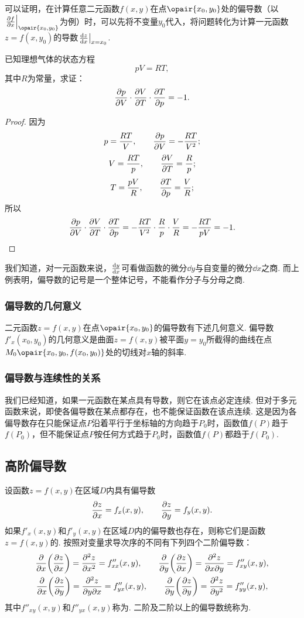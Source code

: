 可以证明，在计算任意二元函数\(f(x,y)\)在点\(\opair{x_0,y_0}\)处的偏导数（以\(\eval{\pdv{f}{x}}_{\opair{x_0,y_0}}\)为例）时，可以先将不变量\(y_0\)代入，将问题转化为计算一元函数\(z = f(x, y_0)\)的导数\(\eval{\dv{z}{x}}_{x=x_0}\).

\begin{example}
已知理想气体的状态方程\[
pV = RT,
\]其中\(R\)为常量，求证：\[
\pdv{p}{V} \cdot \pdv{V}{T} \cdot \pdv{T}{p} = -1.
\]
\begin{proof}
因为\[
p = \frac{RT}{V}, \qquad \pdv{p}{V} = -\frac{RT}{V^2};
\]\[
V = \frac{RT}{p}, \qquad \pdv{V}{T} = \frac{R}{p};
\]\[
T = \frac{pV}{R}, \qquad \pdv{T}{p} = \frac{V}{R};
\]所以\[
\pdv{p}{V} \cdot \pdv{V}{T} \cdot \pdv{T}{p}
= -\frac{RT}{V^2} \cdot \frac{R}{p} \cdot \frac{V}{R}
= -\frac{RT}{pV} = -1.
\qedhere
\]
\end{proof}
\end{example}

我们知道，对一元函数来说，\(\dv{y}{x}\)可看做函数的微分\(\dd{y}\)与自变量的微分\(\dd{x}\)之商.
而上例表明，偏导数的记号是一个整体记号，不能看作分子与分母之商.

\subsubsection{偏导数的几何意义}
二元函数\(z=f(x,y)\)在点\(\opair{x_0,y_0}\)的偏导数有下述几何意义.
偏导数\(f'_x(x_0,y_0)\)的几何意义是曲面\(z=f(x,y)\)被平面\(y=y_0\)所截得的曲线在点\(M_0\opair{x_0,y_0,f(x_0,y_0)}\)处的切线对\(x\)轴的斜率.

\subsubsection{偏导数与连续性的关系}
我们已经知道，如果一元函数在某点具有导数，则它在该点必定连续.
但对于多元函数来说，即使各偏导数在某点都存在，也不能保证函数在该点连续.
这是因为各偏导数存在只能保证点\(P\)沿着平行于坐标轴的方向趋于\(P_0\)时，函数值\(f(P)\)趋于\(f(P_0)\)，但不能保证点\(P\)按任何方式趋于\(P_0\)时，函数值\(f(P)\)都趋于\(f(P_0)\).

\subsection{高阶偏导数}
\begin{definition}
设函数\(z=f(x,y)\)在区域\(D\)内具有偏导数\[
\pdv{z}{x} = f_x(x,y), \qquad
\pdv{z}{y} = f_y(x,y).
\]如果\(f'_x(x,y)\)和\(f'_y(x,y)\)在区域\(D\)内的偏导数也存在，则称它们是函数\(z=f(x,y)\)的.
按照对变量求导次序的不同有下列四个二阶偏导数：
\begin{gather*}
\pdv{x}(\pdv{z}{x}) = \pdv[2]{z}{x} = f''_{xx}(x,y),
\qquad
\pdv{y}(\pdv{z}{x}) = \pdv{z}{x}{y} = f''_{xy}(x,y), \\
\pdv{x}(\pdv{z}{y}) = \pdv{z}{y}{x} = f''_{yx}(x,y),
\qquad
\pdv{y}(\pdv{z}{y}) = \pdv[2]{z}{y} = f''_{yy}(x,y),
\end{gather*}
其中\(f''_{xy}(x,y)\)和\(f''_{yx}(x,y)\)称为.
二阶及二阶以上的偏导数统称为.
\end{definition}

